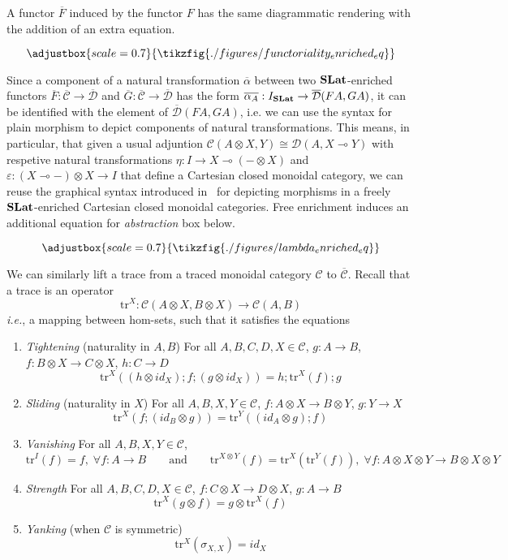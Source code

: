 \documentclass[acmsmall, screen, nonacm]{acmart}
\newcommand\enriched[1]{{\overline{\mathcal{#1}}}}
\begin{document}
A functor $\overline{F}$ induced by the functor $F$ has the same diagrammatic rendering with the addition of an extra equation.

\[
\adjustbox{scale=0.7}{
\tikzfig{./figures/functoriality_enriched_eq}
}
\]

Since a component of a natural transformation $\overline{\alpha}$ between two $\mathbf{SLat}$-enriched functors $\overline{F} : \enriched{C} \to \enriched{D}$ and $\overline{G}: \enriched{C} \to \enriched{D}$ has the form $\overline{\alpha_{A}} : I_{\catname{SLat}} \to \enriched{D}(FA, GA)$, it can be identified with the element of $\enriched{D}(FA,GA)$, i.e. we can use the syntax for plain morphism to depict components of natural transformations.
This means, in particular, that given a usual adjuntion $\mathcal{C}(A \otimes X, Y) \cong \mathcal{D}(A, X \multimap Y)$ with respetive natural transformations $\eta : I \to X \multimap (- \otimes X)$ and $\varepsilon : (X \multimap -) \otimes X \to I$ that define a Cartesian closed monoidal category, we can reuse the graphical syntax introduced in~\cite{GhicaZanassiStringLambda}
for depicting morphisms in a freely $\mathbf{SLat}$-enriched Cartesian closed monoidal categories.
Free enrichment induces an additional equation for \textit{abstraction} box below.

\[
\adjustbox{scale=0.7}{
  \tikzfig{./figures/lambda_enriched_eq}
}
\]

We can similarly lift a trace from a traced monoidal category $\mathcal{C}$ to $\enriched{C}$.
Recall that a trace is an operator
\[
\text{tr}^{X} : \mathcal{C}(A \otimes X, B \otimes X) \to \mathcal{C}(A,B)
\]
\textit{i.e.}, a mapping between hom-sets, such that it satisfies the equations
\begin{enumerate}
  \item \textit{Tightening} (naturality in $A,B$) For all $A, B, C, D, X \in \mathcal{C}$, $g : A \to B$, $f : B \otimes X \to C \otimes X$, $h : C \to D$
  \[
  \text{tr}^{X}((h \otimes id_{X});f;(g \otimes id_{X})) = h;\text{tr}^{X}(f);g
  \]
  \item \textit{Sliding} (naturality in $X$) For all $A,B,X,Y \in \mathcal{C}$, $f : A \otimes X \to B \otimes Y$, $g : Y \to X$
  \[
   \text{tr}^{X}(f;(id_{B} \otimes g)) = \text{tr}^{Y}((id_{A} \otimes g); f) 
  \]
  \item \textit{Vanishing} For all $A,B,X,Y \in \mathcal{C}$,
  \[
  \text{tr}^{I}(f) = f,\; \forall f : A \to B \qquad \text{and} \qquad \text{tr}^{X \otimes Y}(f) = \text{tr}^{X}(\text{tr}^{Y}(f)), \; \forall f : A \otimes X \otimes Y \to B \otimes X \otimes Y
  \]
  \item \textit{Strength} For all $A,B,C,D,X \in \mathcal{C}$, $f : C \otimes X \to D \otimes X$, $g : A \to B$
    \[
    \text{tr}^{X}(g \otimes f) = g \otimes \text{tr}^{X}(f)
    \] 
  \item \textit{Yanking} (when $\mathcal{C}$ is symmetric)
    \[
    \text{tr}^{X}(\sigma_{X,X}) = id_{X}
    \]
\end{enumerate}
\end{document}
